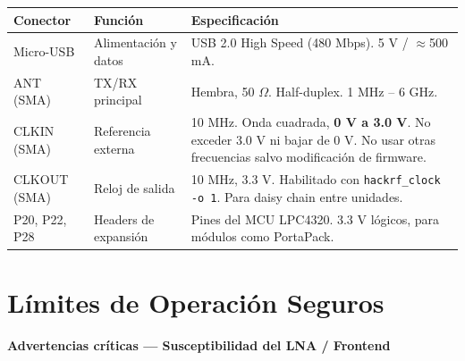 \documentclass[11pt]{article}
\begin{document}
\begin{table}[h]
    \centering
    \small
    \begin{tabular}{p{}p{}p{}}
        \toprule
        \textbf{Conector} & \textbf{Función} & \textbf{Especificación} \\
        \midrule
        Micro-USB   & Alimentación y datos  & USB 2.0 High Speed (480 Mbps). 5 V / $\approx$500 mA. \\
        ANT (SMA)   & TX/RX principal       & Hembra, 50 $\Omega$. Half-duplex. 1 MHz -- 6 GHz. \\
        CLKIN (SMA) & Referencia externa    & 10 MHz. Onda cuadrada, \textbf{0 V a 3.0 V}. No exceder 3.0 V ni bajar de 0 V. No usar otras frecuencias salvo modificación de firmware. \\
        CLKOUT (SMA)& Reloj de salida       & 10 MHz, 3.3 V. Habilitado con \texttt{hackrf\_clock -o 1}. Para daisy chain entre unidades. \\
        P20, P22, P28 & Headers de expansión & Pines del MCU LPC4320. 3.3 V lógicos, para módulos como PortaPack. \\
        \bottomrule
    \end{tabular}
\end{table}

\section{Límites de Operación Seguros}

\begin{advertencia}
\textbf{Advertencias críticas — Susceptibilidad del LNA / Frontend}
\end{advertencia}
\end{document}
